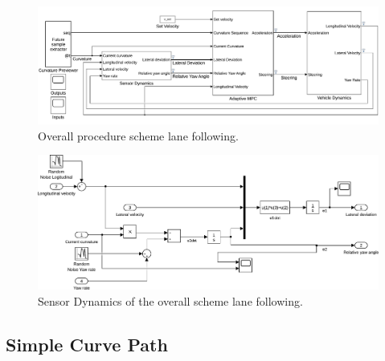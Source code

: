 \begin{figure}[!h]
	\centering
	\includegraphics[width=\textwidth]{../figure/lane_following_AMPC.pdf}
	\caption{Overall procedure scheme lane following.}
	\label{fig:scheme_lane_following}
\end{figure}

\begin{figure}[!h]
	\centering
	\includegraphics[width=\textwidth]{../figure/lane_following_AMPC_sensor_dynamics.pdf}
	\caption{Sensor Dynamics of the overall scheme lane following.}
	\label{fig:scheme_lane_following_sensor_dynamics}
\end{figure}


\subsection{Simple Curve Path}


